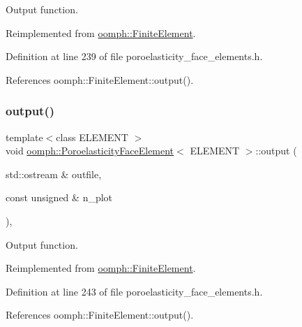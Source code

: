 Output function. 



Reimplemented from \hyperlink{classoomph_1_1FiniteElement_a2ad98a3d2ef4999f1bef62c0ff13f2a7}{oomph\+::\+Finite\+Element}.



Definition at line 239 of file poroelasticity\+\_\+face\+\_\+elements.\+h.



References oomph\+::\+Finite\+Element\+::output().

\mbox{\label{classoomph_1_1PoroelasticityFaceElement_af3fd2b11f51ab4c5824e31d0658fd30b}} 
\subsubsection{\texorpdfstring{output()}{output()}\hspace{0.1cm}{\footnotesize\ttfamily [2/4]}}
{\footnotesize\ttfamily template$<$class E\+L\+E\+M\+E\+NT $>$ \\
void \hyperlink{classoomph_1_1PoroelasticityFaceElement}{oomph\+::\+Poroelasticity\+Face\+Element}$<$ E\+L\+E\+M\+E\+NT $>$\+::output (\begin{DoxyParamCaption}\item[{std\+::ostream \&}]{outfile,  }\item[{const unsigned \&}]{n\+\_\+plot }\end{DoxyParamCaption})\hspace{0.3cm}{\ttfamily [inline]}, {\ttfamily [virtual]}}



Output function. 



Reimplemented from \hyperlink{classoomph_1_1FiniteElement_afa9d9b2670f999b43e6679c9dd28c457}{oomph\+::\+Finite\+Element}.



Definition at line 243 of file poroelasticity\+\_\+face\+\_\+elements.\+h.



References oomph\+::\+Finite\+Element\+::output().

\mbox{\label{classoomph_1_1PoroelasticityFaceElement_ad996cd2d792e1d74d4d80950493facf8}} 
